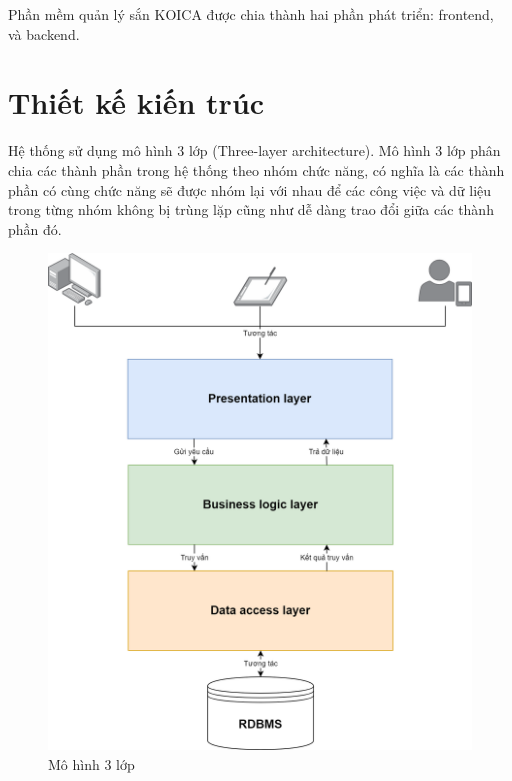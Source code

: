 \documentclass[./../main.tex]{subfiles}
\begin{document}
Phần mềm quản lý sắn KOICA được chia thành hai phần phát triển: frontend, và backend.

\section{Thiết kế kiến trúc}

Hệ thống sử dụng mô hình 3 lớp (Three-layer architecture). Mô hình 3 lớp phân chia các thành phần trong hệ thống theo nhóm chức năng, có nghĩa là các thành phần có cùng chức năng sẽ được nhóm lại với nhau để các công việc và dữ liệu trong từng nhóm không bị trùng lặp cũng như dễ dàng trao đổi giữa các thành phần đó.

\begin{figure}[H]
	\centering
	\includegraphics[width=\linewidth]{./img/architecture.png}
	\caption{Mô hình 3 lớp}
    \label{fig:architecture}
\end{figure}
\end{document}
